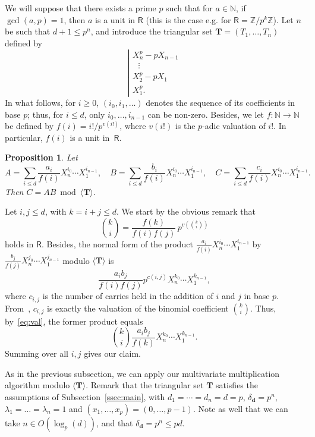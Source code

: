 \documentclass[amsthm]{elsart}
\def\d {\ensuremath{\mathbf{d}}}
\def\N {\ensuremath{\mathbb{N}}}
\def\Z {\ensuremath{\mathbb{Z}}}
\def\T {\ensuremath{\mathbf{T}}}
\def\rng {\ensuremath{\mathsf{R}}}
\theoremstyle{plain}
\newtheorem{Proposition}{Proposition}
\begin{document}
We will suppose that there exists a prime $p$ such that for $a \in
\N$, if $\gcd(a,p)=1$, then $a$ is a unit in $\rng$ (this is the case
e.g. for $\rng=\Z/p^k\Z$). Let $n$ be such that $d+1 \le p^n$, and
introduce the triangular set $\T=(T_1,\dots,T_n)$ defined by
$$\left | 
\begin{array}{l}
X_n^p-pX_{n-1}\\
~~~\vdots\\
X_2^p-pX_1\\
X_1^p.
\end{array}\right .
$$
In what follows, for $i \ge 0$, $(i_0,i_1,\dots)$ denotes the sequence
of its coefficients in base $p$; thus, for $i\le d$, only
$i_0,\dots,i_{n-1}$ can be non-zero.  Besides, we let $f:\N \to \N$ be
defined by $f(i)=i!/p^{v(i!)}$, where $v(i!)$ is the $p$-adic
valuation of $i!$. In particular, $f(i)$ is a unit in~$\rng$.
\begin{Proposition}
  Let 
$$A=\sum_{i \le d} \frac{a_i}{f(i)} X_n^{i_0} \cdots X_1^{i_{n-1}},\quad
B=\sum_{i \le d} \frac{b_i}{f(i)} X_n^{i_0} \cdots X_1^{i_{n-1}},\quad
C=\sum_{i \le d} \frac{c_i}{f(i)} X_n^{i_0} \cdots X_1^{i_{n-1}}.$$ Then
$C=AB \bmod \langle \T \rangle$.
\end{Proposition}
\begin{pf}
  Let $i,j \le d$, with $k=i+j \le d$. We start by the obvious remark that
  \begin{equation}
    \label{eq:val}
 {k \choose i} = \frac{f(k)}{f(i)f(j)}\, p^{v({k \choose i})}    
  \end{equation}
holds in $\rng$. Besides, the normal form of the product
$\frac{a_i}{f(i)} X_n^{i_0} \cdots X_1^{i_{n-1}}$ by
$\frac{b_j}{f(j)} X_n^{j_0} \cdots X_1^{j_{n-1}}$ modulo $\langle \T \rangle$ is
$$\frac{a_i b_j}{f(i)f(j)} p^{c(i,j)} X_n^{k_0} \cdots X_1^{k_{n-1}},$$
where $c_{i,j}$ is the number of carries held in the addition of $i$ and $j$ 
in base $p$. From~\cite[Eq.~(1.6)]{StMoAm08}, $c_{i,j}$ is exactly 
the valuation of the binomial coefficient $k \choose i$.
Thus, by~\eqref{eq:val}, the former product equals
$${k \choose i} \frac{a_i b_j}{f(k)}X_n^{k_0} \cdots X_1^{k_{n-1}}.$$
Summing over all $i,j$ gives our claim.
\end{pf}

As in the previous subsection, we can apply our multivariate
multiplication algorithm modulo $\langle \T \rangle$. Remark that the
triangular set $\T$ satisfies the assumptions of
Subsection~\ref{ssec:main}, with $d_1=\cdots=d_n=d=p$,
$\delta_\d=p^n$, $\lambda_1=\dots=\lambda_n=1$ and
$(x_1,\dots,x_p)=(0,\dots,p-1)$. Note as well that we can take $n\in
O(\log_p(d))$, and that $\delta_\d=p^n \le pd$.
\end{document}
